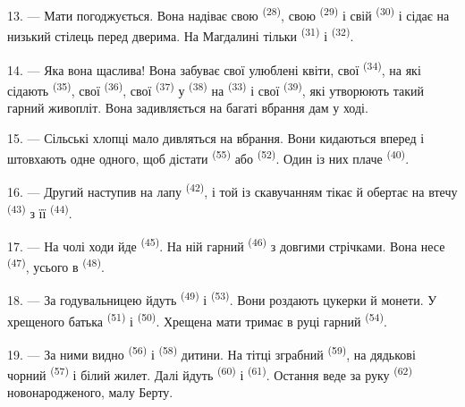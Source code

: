 13. --- Мати погоджується. Вона надіває свою 
\textsuperscript{(28)}, свою  \textsuperscript{(29)} і свій
 \textsuperscript{(30)} і сідає на низький стілець перед дверима.
На Магдалині тільки  \textsuperscript{(31)} і 
\textsuperscript{(32)}.

14. --- Яка вона щаслива! Вона забуває свої улюблені квіти, свої
 \textsuperscript{(34)}, на які сідають 
\textsuperscript{(35)}, свої  \textsuperscript{(36)}, свої
 \textsuperscript{(37)} у 
\textsuperscript{(38)} на  \textsuperscript{(33)} і свої
 \textsuperscript{(39)}, які утворюють такий гарний живопліт.
Вона задивляється на багаті вбрання дам у ході.

15. --- Сільські хлопці мало дивляться на вбрання. Вони кидаються вперед і
штовхають одне одного, щоб дістати  \textsuperscript{(55)} або
 \textsuperscript{(52)}. Один із них плаче
\textsuperscript{(40)}.

16. --- Другий наступив на лапу  \textsuperscript{(42)}, і той із
скавучанням тікає й обертає на втечу  \textsuperscript{(43)} з її
 \textsuperscript{(44)}.

\VUsaut{5.0mm}
\VUsaut{4.0mm}

17. --- На чолі ходи йде  \textsuperscript{(45)}. На ній
гарний  \textsuperscript{(46)} з довгими стрічками. Вона несе
 \textsuperscript{(47)}, усього в 
\textsuperscript{(48)}.

18. --- За годувальницею йдуть  \textsuperscript{(49)} і
 \textsuperscript{(53)}. Вони роздають цукерки й монети. У
хрещеного батька  \textsuperscript{(51)} і 
\textsuperscript{(50)}. Хрещена мати тримає в руці гарний 
\textsuperscript{(54)}.

19. --- За ними видно  \textsuperscript{(56)} і 
\textsuperscript{(58)} дитини. На тітці зграбний 
\textsuperscript{(59)}, на дядькові чорний 
\textsuperscript{(57)} і білий жилет. Далі йдуть 
\textsuperscript{(60)} і  \textsuperscript{(61)}.
Остання веде за руку  \textsuperscript{(62)} новонародженого,
малу Берту.


